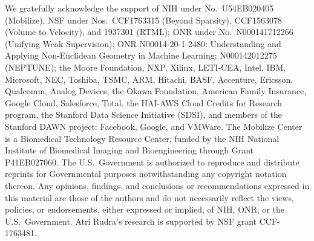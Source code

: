 \documentclass{article} %
\begin{document}
We gratefully acknowledge the support of NIH under No.\ U54EB020405 (Mobilize), NSF under Nos.\ CCF1763315 (Beyond Sparsity), CCF1563078 (Volume to Velocity), and 1937301 (RTML); ONR under No.\ N000141712266 (Unifying Weak Supervision); ONR N00014-20-1-2480: Understanding and Applying Non-Euclidean Geometry in Machine Learning; N000142012275 (NEPTUNE); the Moore Foundation, NXP, Xilinx, LETI-CEA, Intel, IBM, Microsoft, NEC, Toshiba, TSMC, ARM, Hitachi, BASF, Accenture, Ericsson, Qualcomm, Analog Devices, the Okawa Foundation, American Family Insurance, Google Cloud, Salesforce, Total, the HAI-AWS Cloud Credits for Research program, the Stanford Data Science Initiative (SDSI), and members of the Stanford DAWN project: Facebook, Google, and VMWare. The Mobilize Center is a Biomedical Technology Resource Center, funded by the NIH National Institute of Biomedical Imaging and Bioengineering through Grant P41EB027060. The U.S.\ Government is authorized to reproduce and distribute reprints for Governmental purposes notwithstanding any copyright notation thereon. Any opinions, findings, and conclusions or recommendations expressed in this material are those of the authors and do not necessarily reflect the views, policies, or endorsements, either expressed or implied, of NIH, ONR, or the U.S.\ Government.
Atri Rudra’s research is supported by NSF grant CCF-1763481.






\appendix
\newpage

\newpage

\newpage

\newpage

\newpage

\newpage

\newpage

\newpage

\newpage

\newpage

\end{document}
